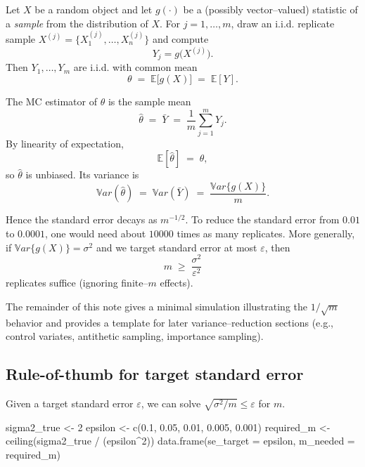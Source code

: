 \documentclass[
  letterpaper,
  DIV=11,
  numbers=noendperiod]{scrreprt}
\newenvironment{Shaded}{\begin{snugshade}}{\end{snugshade}}
\newcommand{\AttributeTok}[1]{\textcolor[rgb]{0.40,0.45,0.13}{#1}}
\newcommand{\DecValTok}[1]{\textcolor[rgb]{0.68,0.00,0.00}{#1}}
\newcommand{\FloatTok}[1]{\textcolor[rgb]{0.68,0.00,0.00}{#1}}
\newcommand{\FunctionTok}[1]{\textcolor[rgb]{0.28,0.35,0.67}{#1}}
\newcommand{\NormalTok}[1]{\textcolor[rgb]{0.00,0.23,0.31}{#1}}
\newcommand{\OtherTok}[1]{\textcolor[rgb]{0.00,0.23,0.31}{#1}}
\newcommand{\SpecialCharTok}[1]{\textcolor[rgb]{0.37,0.37,0.37}{#1}}
\begin{document}
Let \(X\) be a random object and let \(g(\cdot)\) be a (possibly
vector--valued) statistic of a \emph{sample} from the distribution of
\(X\). For \(j=1,\ldots,m\), draw an i.i.d. replicate sample
\(X^{(j)}=\{X^{(j)}_1,\ldots,X^{(j)}_n\}\) and compute \[
Y_j = g\!\big(X^{(j)}\big).
\tag{6.5}
\] Then \(Y_1,\ldots,Y_m\) are i.i.d. with common mean \[
\theta \;=\; \mathbb{E}\big[g(X)\big] \;=\; \mathbb{E}[Y].
\]

The MC estimator of \(\theta\) is the sample mean \[
\hat{\theta}\;=\; \bar Y \;=\; \frac{1}{m}\sum_{j=1}^m Y_j.
\] By linearity of expectation, \[
\mathbb{E}[\hat{\theta}] \;=\; \theta,
\] so \(\hat{\theta}\) is unbiased. Its variance is \[
\mathbb{V}ar(\hat{\theta})
  \;=\; \mathbb{V}ar(\bar Y)
  \;=\; \frac{\mathbb{V}ar\{g(X)\}}{m}.
\]

Hence the standard error decays as \(m^{-1/2}\). To reduce the standard
error from \(0.01\) to \(0.0001\), one would need about \(10000\) times
as many replicates. More generally, if \(\mathbb{V}ar\{g(X)\}=\sigma^2\)
and we target standard error at most \(\varepsilon\), then \[
m \;\ge\; \frac{\sigma^2}{\varepsilon^2}
\] replicates suffice (ignoring finite--\(m\) effects).

The remainder of this note gives a minimal simulation illustrating the
\(1/\sqrt{m}\) behavior and provides a template for later
variance--reduction sections (e.g., control variates, antithetic
sampling, importance sampling).

\subsection{Rule-of-thumb for target standard
error}\label{rule-of-thumb-for-target-standard-error}

Given a target standard error \(\varepsilon\), we can solve
\(\sqrt{\sigma^2/m} \le \varepsilon\) for \(m\).

\begin{Shaded}
\begin{Highlighting}[]
\NormalTok{sigma2\_true }\OtherTok{\textless{}{-}} \DecValTok{2}
\NormalTok{epsilon }\OtherTok{\textless{}{-}} \FunctionTok{c}\NormalTok{(}\FloatTok{0.1}\NormalTok{, }\FloatTok{0.05}\NormalTok{, }\FloatTok{0.01}\NormalTok{, }\FloatTok{0.005}\NormalTok{, }\FloatTok{0.001}\NormalTok{)}
\NormalTok{required\_m }\OtherTok{\textless{}{-}} \FunctionTok{ceiling}\NormalTok{(sigma2\_true }\SpecialCharTok{/}\NormalTok{ (epsilon}\SpecialCharTok{\^{}}\DecValTok{2}\NormalTok{))}
\FunctionTok{data.frame}\NormalTok{(}\AttributeTok{se\_target =}\NormalTok{ epsilon, }\AttributeTok{m\_needed =}\NormalTok{ required\_m)}
\end{Highlighting}
\end{Shaded}
\end{document}
